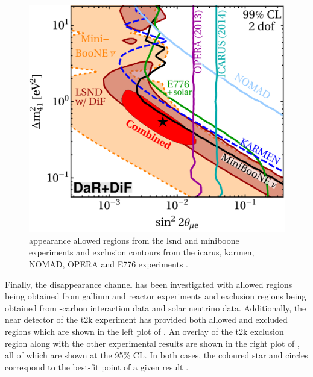 \begin{figure}[!h]
    \centering
    \includegraphics[width = \largefigwidth]{figures-chap6/external_limits/nue_app_combo.png}
    \caption[\nue appearance limits from the \gls{lsnd}, \gls{miniboone}, \gls{icarus}, \gls{karmen}, NOMAD, OPERA and E776 experiments.]{\nue appearance allowed regions from the \gls{lsnd} and \gls{miniboone} experiments and exclusion contours from the \gls{icarus}, \gls{karmen}, NOMAD, OPERA and E776 experiments \cite{LSND_KARMEN_nue_app_contour}.}
    \label{fig:nue_app_external}
\end{figure}

Finally, the \nue disappearance channel has been investigated with allowed regions being obtained from gallium and reactor experiments and exclusion regions being obtained from \nue-carbon interaction data and solar neutrino data. Additionally, the near detector of the \gls{t2k} experiment has provided both allowed and excluded regions which are shown in the left plot of . An overlay of the \gls{t2k} exclusion region along with the other experimental results are shown in the right plot of , all of which are shown at the 95\% CL. In both cases, the coloured star and circles correspond to the best-fit point of a given result \cite{T2K_nue_disapp_contour}. 

